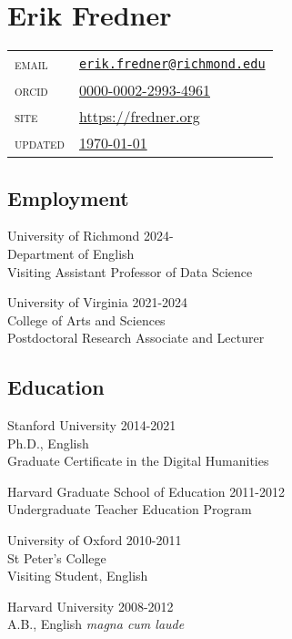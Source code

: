 \documentclass[
  12pt,
  letterpaper,
]{article}
\author{}
\date{}
\begin{document}
\hypertarget{erik-fredner}{%
\section{Erik Fredner}\label{erik-fredner}}

\begin{longtable}[]{@{}ll@{}}
\endhead
\endlastfoot
\textsc{email} &
\href{mailto:erik.fredner@richmond.edu}{\nolinkurl{erik.fredner@richmond.edu}} \\
\textsc{orcid} &
\href{https://orcid.org/0000-0002-2993-4961}{0000-0002-2993-4961} \\
\textsc{site} & \href{https://fredner.org}{https://fredner.org}\\
\textsc{updated} & \href{https://github.com/erikfredner/cv}{\today} \\
\end{longtable}

\hypertarget{employment}{%
\subsection{Employment}\label{employment}}

University of Richmond \hfill 2024-\\
Department of English\\
Visiting Assistant Professor of Data Science

University of Virginia \hfill 2021-2024\\
College of Arts and Sciences\\
Postdoctoral Research Associate and Lecturer

\hypertarget{education}{%
\subsection{Education}\label{education}}

Stanford University \hfill 2014-2021\\
Ph.D., English\\
Graduate Certificate in the Digital Humanities

Harvard Graduate School of Education \hfill 2011-2012\\
Undergraduate Teacher Education Program

University of Oxford \hfill 2010-2011\\
St Peter's College\\
Visiting Student, English

Harvard University \hfill 2008-2012\\
A.B., English \emph{magna cum laude}
\end{document}
